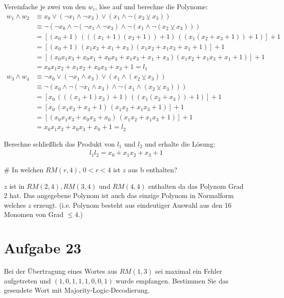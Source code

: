 \begin{myList}
Vereinfache je zwei von den $w_i$, löse auf und berechne die Polynome:
\begin{align*}
	w_1 \wedge w_2 &\equiv  x_0 \vee (\neg x_1 \wedge \neg x_3) \vee ( x_1 \wedge \neg(x_2 \veebar x_3)) \\
	&\equiv \neg(\neg x_0 \wedge \neg(\neg x_1 \wedge \neg x_3) \wedge \neg(x_1 \wedge \neg (x_2 \veebar x_3)))\\
	&= [(x_0+1)\, (((x_1+1)(x_3+1))+1)\, ((x_1(x_2+x_3+1))+1 )] +1 \\
	&= [(x_0+1)\, (x_1x_3 + x_1 + x_3)(x_1x_2+x_1x_3+x_1+1)]+1 \\
	&= [(x_0x_1x_3 + x_0x_1 + x_0x_3 + x_1x_3 + x_1 + x_3)(x_1x_2+x_1x_3+x_1+1)]+1 \\
	&= x_0x_1x_2 + x_1x_2 + x_0x_3 +x_3 +1 = l_1 \\
	w_3 \wedge w_4 &\equiv \neg x_0 \vee (\neg x_1 \wedge x_3) \vee (x_1 \wedge (x_2 \veebar x_3)) \\
	&\equiv \neg(x_0 \wedge \neg(\neg x_1 \wedge x_3) \wedge \neg(x_1 \wedge (x_2 \veebar x_3))) \\
	&= [x_0\, (((x_1+1)x_3)+1) \, ((x_1(x_2 +x_3))+1)] +1\\
	&= [x_0\, (x_1x_3 +x_3 + 1) \, (x_1x_2 + x_1x_3 + 1) ] +1 \\
	&= [(x_0x_1x_3 + x_0x_3 + x_0)\, (x_1x_2 + x_1x_3 + 1) ] +1 \\
	&= x_0x_1x_2 + x_0x_3 + x_0 + 1 = l_2
\end{align*}

Berechne schließlich das Produkt von $l_1$ und $l_2$ und erhalte die Lösung:
\begin{align*}
	l_1l_2 = x_0 + x_1x_2 + x_3 + 1
\end{align*}

#
In welchen $RM(r,4)$, $0 < r < 4$ ist $z$ aus b enthalten?\medskip

$z$ ist in $RM(2,4),RM(3,4)$ und $RM(4,4)$ enthalten da das Polynom Grad 2 hat.
Das angegebene Polynom ist auch das einzige Polynom in Normalform welches $z$ erzeugt.
(i.e. Polynom besteht aus eindeutiger Auswahl aus den 16 Monomen von Grad $\leq 4$.)
\end{myList}

\section*{Aufgabe 23}
Bei der Übertragung eines Wortes aus $RM(1,3)$ sei maximal ein Fehler aufgetreten und $(1,0,1,1,1,0,0,1)$ wurde empfangen. Bestimmen Sie das gesendete Wort mit Majority-Logic-Decodierung.\medskip

